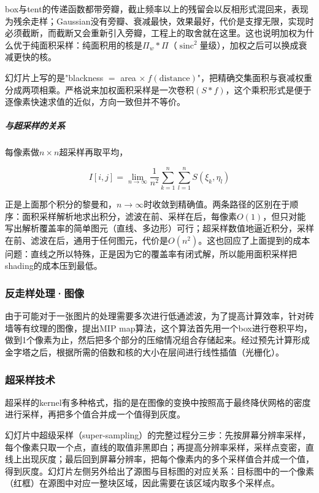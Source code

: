 box与tent的传递函数都带旁瓣，截止频率以上的残留会以反相形式混回来，表现为残余走样；Gaussian没有旁瓣、衰减最快，效果最好，代价是支撑无限，实现时必须截断，而截断又会重新引入旁瓣，工程上的取舍就在这里。这也说明加权为什么优于纯面积采样：纯面积用的核是$\Pi_w*\Pi$（$\operatorname{sinc}^2$量级），加权之后可以换成衰减更快的核。

幻灯片上写的是"blackness $=$ area $\times\ f(\text{distance})$"，把精确交集面积与衰减权重分成两项相乘。严格说来加权面积采样是一次卷积$(S*f)$，这个乘积形式是便于逐像素快速求值的近似，方向一致但并不等价。

\subparagraph{与超采样的关系}

每像素做$n\times n$超采样再取平均，

\[
I[i,j] = \lim_{n\to\infty}\frac{1}{n^2}\sum_{k=1}^{n}\sum_{l=1}^{n}S(\xi_k,\eta_l)
\]

正是上面那个积分的黎曼和，$n\to\infty$时收敛到精确值。两条路径的区别在于顺序：面积采样解析地求出积分，滤波在前、采样在后，每像素$O(1)$，但只对能写出解析覆盖率的简单图元（直线、多边形）可行；超采样数值地逼近积分，采样在前、滤波在后，通用于任何图元，代价是$O(n^2)$。这也回应了上面提到的成本问题：直线之所以特殊，正是因为它的覆盖率有闭式解，所以能用面积采样把shading的成本压到最低。

\subsubsection{反走样处理·图像}

由于可能对于一张图片的处理需要多次进行低通滤波，为了提高计算效率，针对砖墙等有纹理的图像，提出MIP map算法，这个算法首先用一个box进行卷积平均，做到1个像素为止，然后把多个部分的压缩情况组合存储起来。经过预先计算形成金字塔之后，根据所需的倍数和核的大小在层间进行线性插值（光栅化）。

\subsubsection{超采样技术}

超采样的kernel有多种格式，指的是在图像的变换中按照高于最终降伏网格的密度进行采样，再把多个值合并成一个值得到灰度。

幻灯片中超级采样（super-sampling）的完整过程分三步：先按屏幕分辨率采样，每个像素只取一个点，直线的取值非黑即白；再提高分辨率采样，采样点变密，直线上出现灰度；最后回到屏幕分辨率，把每个像素内的多个采样值合并成一个值，得到灰度。幻灯片左侧另外给出了源图与目标图的对应关系：目标图中的一个像素（红框）在源图中对应一整块区域，因此需要在该区域内取多个采样点。

